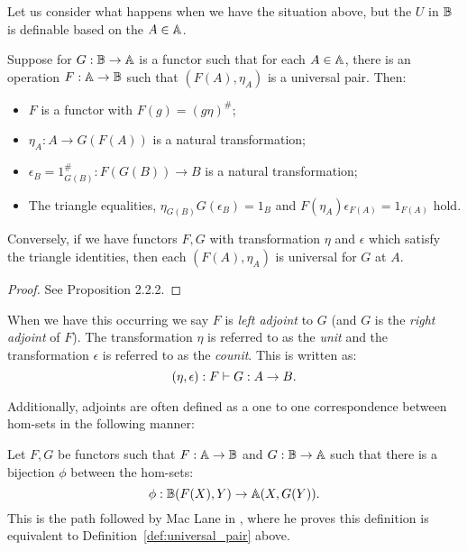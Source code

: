 Let us consider what happens when we have the situation above, but the $U$ in $\mathbb{B}$ is definable
based on the $A\in\mathbb{A}$.
\begin{lemma}\label{lem:adjoint-setup}
  Suppose for $G:\mathbb{B}\to\mathbb{A}$ is a functor such that for each $A\in\mathbb{A}$, there is an operation
  $F:\mathbb{A}\to\mathbb{B}$ such that  $(F(A),\eta_A)$ is a universal pair. Then:
  \begin{itemize}
    \item $F$ is a functor with $F(g) = (g\eta)^{\#}$;
    \item $\eta_A: A \to G(F(A))$ is a natural transformation;
    \item $\epsilon_B = 1_{G(B)}^{\#}:F(G(B)) \to B$ is a natural transformation;
    \item The triangle equalities, $\eta_{G(B)}G(\epsilon_B) = 1_B$ and $F(\eta_A)\epsilon_{F(A)} =
      1_{F(A)}$ hold.
  \end{itemize}
  Conversely, if we have functors $F,G$ with transformation $\eta$ and $\epsilon$ which satisfy the
  triangle identities, then each $(F(A),\eta_A)$ is universal for $G$ at $A$.
\end{lemma}
\begin{proof}
  See Proposition 2.2.2\cite{cockett2009:ctcs}.
\end{proof}

When we have this occurring we say $F$ is \emph{left adjoint} to $G$ (and $G$ is the
\emph{right adjoint} of $F$). The transformation $\eta$ is referred to as the \emph{unit} and the
transformation $\epsilon$ is referred to as the \emph{counit}. This is written as:
\[
  (\eta,\epsilon):F\vdash G:A\to B.
\]

Additionally, adjoints are often defined as a one to one correspondence between hom-sets in the
following manner:

Let $F,G$ be functors such that $F:\mathbb{A} \to \mathbb{B}$ and $G:\mathbb{B} \to \mathbb{A}$ such that there is a bijection $\phi$
between the hom-sets:
\[
  \phi: \mathbb{B}(F(X),Y) \to \mathbb{A}(X,G(Y)).
\]
This is the path followed by Mac Lane in \cite{maclan97:categorieswrkmath}, where he proves this
definition is equivalent to Definition~\ref{def:universal_pair} above.



